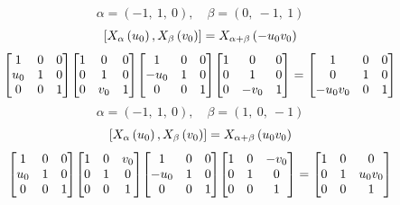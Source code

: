 \documentclass[11pt]{article}
\theoremstyle{definition}
\begin{document}
\[
\alpha = \left( -1, \  1, \  0\right), \quad \beta = \left( 0, \  -1, \  1\right)
\]
\[
\scaletoalign{\textwidth}{\left[ X_{\alpha}\left(u_{0}\right), X_{\beta}\left(v_{0}\right) \right] = X_{\alpha + \beta}\left(- u_{0} v_{0}\right)}
\]
\[
\scaletoalign{\textwidth}{{\left[\begin{matrix}1 & 0 & 0\\u_{0} & 1 & 0\\0 & 0 & 1\end{matrix}\right]} {\left[\begin{matrix}1 & 0 & 0\\0 & 1 & 0\\0 & v_{0} & 1\end{matrix}\right]} {\left[\begin{matrix}1 & 0 & 0\\- u_{0} & 1 & 0\\0 & 0 & 1\end{matrix}\right]} {\left[\begin{matrix}1 & 0 & 0\\0 & 1 & 0\\0 & - v_{0} & 1\end{matrix}\right]} = {\left[\begin{matrix}1 & 0 & 0\\0 & 1 & 0\\- u_{0} v_{0} & 0 & 1\end{matrix}\right]}}
\]
\[
\alpha = \left( -1, \  1, \  0\right), \quad \beta = \left( 1, \  0, \  -1\right)
\]
\[
\scaletoalign{\textwidth}{\left[ X_{\alpha}\left(u_{0}\right), X_{\beta}\left(v_{0}\right) \right] = X_{\alpha + \beta}\left(u_{0} v_{0}\right)}
\]
\[
\scaletoalign{\textwidth}{{\left[\begin{matrix}1 & 0 & 0\\u_{0} & 1 & 0\\0 & 0 & 1\end{matrix}\right]} {\left[\begin{matrix}1 & 0 & v_{0}\\0 & 1 & 0\\0 & 0 & 1\end{matrix}\right]} {\left[\begin{matrix}1 & 0 & 0\\- u_{0} & 1 & 0\\0 & 0 & 1\end{matrix}\right]} {\left[\begin{matrix}1 & 0 & - v_{0}\\0 & 1 & 0\\0 & 0 & 1\end{matrix}\right]} = {\left[\begin{matrix}1 & 0 & 0\\0 & 1 & u_{0} v_{0}\\0 & 0 & 1\end{matrix}\right]}}
\]
\end{document}
